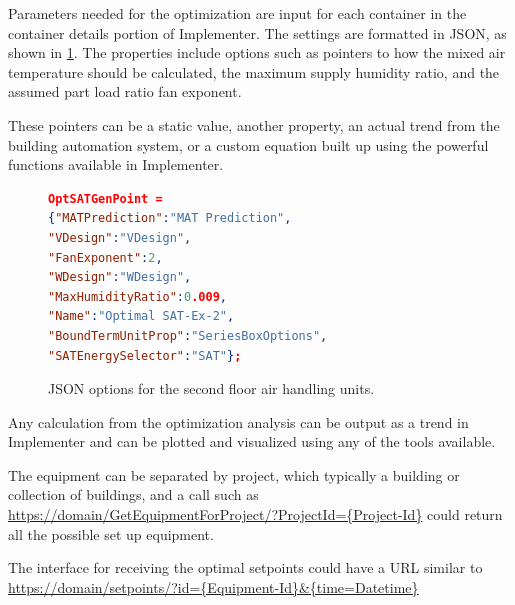 Parameters needed for the optimization are input for each container in
the container details portion of Implementer. The settings are formatted
in JSON, as shown in \figref{} \ref{fig:JSONOptions}. The properties
include options such as pointers to how the mixed air temperature
should be calculated, the maximum supply humidity ratio, and the
assumed part load ratio fan exponent. 

These pointers can be a static value, another property, an actual
trend from the building automation system, or a custom equation built up
using the powerful functions available in Implementer.

\begin{figure}
\centering
\begin{lstlisting}[language=json]
OptSATGenPoint = 
{"MATPrediction":"MAT Prediction",
"VDesign":"VDesign",
"FanExponent":2,
"WDesign":"WDesign",
"MaxHumidityRatio":0.009,
"Name":"Optimal SAT-Ex-2",
"BoundTermUnitProp":"SeriesBoxOptions",
"SATEnergySelector":"SAT"};
\end{lstlisting}
\caption{JSON options for the second floor air handling units. }
\label{fig:JSONOptions}
\end{figure}

Any calculation from the optimization analysis can be output as a trend
in Implementer and can be plotted and visualized using any of the tools
available. 

The equipment can be separated by project, which typically a building or
collection of buildings, and a call such as
\url{https://domain/GetEquipmentForProject/?ProjectId={Project-Id}}
could return all the possible set up equipment.

The interface for receiving the optimal setpoints could have a URL
similar to 
\url{https://domain/setpoints/?id={Equipment-Id}\&{time=Datetime}}




